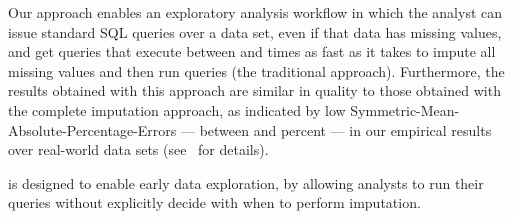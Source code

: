 

Our approach enables an exploratory analysis workflow in which the analyst can issue standard SQL queries over a data set, even if that data has missing values, and get
queries that execute between \lowxalphazero{} and \highxalphaoneexacs{} times as fast as it takes to impute all missing values and then run queries (the traditional approach). Furthermore, the results obtained with this approach
are similar in quality to those obtained with the complete imputation approach, as indicated by low Symmetric-Mean-Absolute-Percentage-Errors --- between \lowsmapealphazero{} and \highsmapealphaoneexacs{} percent --- in our empirical results
over real-world data sets (see~ for details).

\ProjectName{} is designed to enable early data exploration, by allowing analysts to run their queries without explicitly decide with when to perform imputation.

